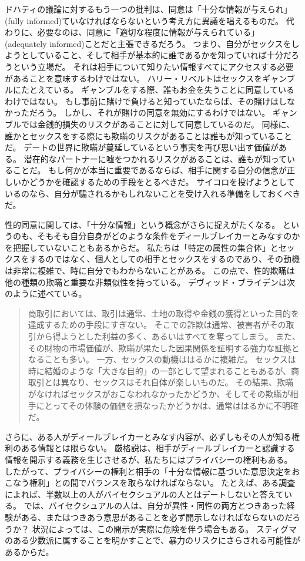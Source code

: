 \documentclass[paper=a4,book,openany]{jlreq} \usepackage{mystyle}
\begin{document}
ドハティの議論に対するもう一つの批判は、同意は「十分な情報が与えられ」(fully informed)ていなければならないという考え方に異議を唱えるものだ。
代わりに、必要なのは、同意に「適切な程度に情報が与えられている」(adequately informed)ことだと主張できるだろう。
つまり、自分がセックスをしようとしていること、そして相手が基本的に誰であるかを知っていれば十分だろうという立場だ。
それは相手について知りたい情報すべてにアクセスする必要があることを意味するわけではない。
ハリー・リベルトはセックスをギャンブルにたとえている。
ギャンブルをする際、誰もお金を失うことに同意しているわけではない。
もし事前に賭けで負けると知っていたならば、その賭けはしなかっただろう。
しかし、それが賭けの同意を無効にするわけではない。
ギャンブルでは金銭的損失のリスクがあることに対して同意しているのだ。
同様に、誰かとセックスをする際にも欺瞞のリスクがあることは誰もが知っていることだ。
\citep[p.132]{liberto17:_inten_sexual_consen}
デートの世界に欺瞞が蔓延しているという事実を再び思い出す価値がある。
潜在的なパートナーに嘘をつかれるリスクがあることは、誰もが知っていることだ。
もし何かが本当に重要であるならば、相手に関する自分の信念が正しいかどうかを確認するための手段をとるべきだ。
サイコロを投げようとしているのなら、自分が騙されるかもしれないことを受け入れる準備をしておくべきだ。

性的同意に関しては、「十分な情報」という概念がさらに捉えがたくなる。
というのも、そもそも自分自身がどのような条件をディールブレイカーとみなすのかを把握していないこともあるからだ。
私たちは「特定の属性の集合体」とセックスをするのではなく、個人としての相手とセックスをするのであり、その動機は非常に複雑で、時に自分でもわからないことがある。
この点で、性的欺瞞は他の種類の欺瞞と重要な非類似性を持っている。
デヴィッド・ブライデンは次のように述べている。
\begin{quote}
商取引においては、取引は通常、土地の取得や金銭の獲得といった目的を達成するための手段にすぎない。
そこでの詐欺は通常、被害者がその取引から得ようとした利益の多く、あるいはすべてを奪ってしまう。
また、その財物の市場価値が、欺瞞が果たした因果関係を証明する強力な証拠となることも多い。
一方、セックスの動機ははるかに複雑だ。
セックスは時に結婚のような「大きな目的」の一部として望まれることもあるが、商取引とは異なり、セックスはそれ自体が楽しいものだ。
その結果、欺瞞がなければセックスがおこなわれなかったかどうか、そしてその欺瞞が相手にとってその体験の価値を損なったかどうかは、通常ははるかに不明確だ。
\citep[p.463]{bryden00:_redef_rape}

\end{quote}

さらに、ある人がディールブレイカーとみなす内容が、必ずしもその人が知る権利のある情報とは限らない。
厳格説は、相手がディールブレイカーと認識する情報を開示する義務を生じさせるが、私たちにはプライバシーの権利もある。
したがって、プライバシーの権利と相手の「十分な情報に基づいた意思決定をおこなう権利」との間でバランスを取らなければならない。
たとえば、ある調査によれば、半数以上の人がバイセクシュアルの人とはデートしないと答えている\citep{thorpe16:_why_won_some_peopl_date_bisex}。
では、バイセクシュアルの人は、自分が異性・同性の両方とつきあった経験がある、またはつきあう意思があることを必ず開示しなければならないのだろうか？ 状況によっては、この開示が実際に危険を伴う場合もある。
スティグマのある少数派に属することを明かすことで、暴力のリスクにさらされる可能性があるからだ。
\end{document}
